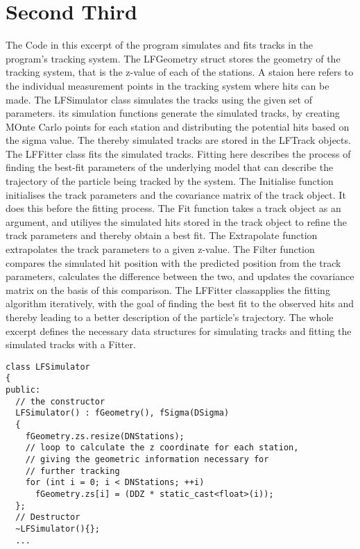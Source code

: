 \documentclass{article}
\begin{document}
\section*{Second Third}
The Code in this excerpt of the program simulates and fits tracks in the program's tracking system.  The LFGeometry struct stores the geometry of the tracking system, that is the z-value of each of the stations. A staion here refers to the individual measurement points in the tracking system where hits can be made. The LFSimulator class simulates the tracks using the given set of parameters. its simulation functions generate the simulated tracks, by creating MOnte Carlo points for each station and distributing the potential hits based on the sigma value. The thereby simulated tracks are stored in the LFTrack objects.  
The LFFitter class fits the simulated tracks. Fitting here describes the process of finding the best-fit parameters of the underlying model that can describe the trajectory of the particle being tracked by the system. The Initialise function initialises the track parameters and the covariance matrix of the track object. It does this before the fitting process. The Fit function takes a track object as an argument, and utiliyes the simulated hits stored in the track object to refine the track parameters and thereby obtain a best fit. The Extrapolate function extrapolates the track parameters to a given z-value. The Filter function compares the simulated hit position with the predicted position from the track parameters, calculates the difference between the two, and updates the covariance matrix on the basis of this comparison. The LFFitter classapplies the fitting algorithm iteratively, with the goal of finding the best fit to the observed hits and thereby leading to a better description of the particle's trajectory.
The whole excerpt defines the necessary data structures for simulating tracks and fitting the simulated tracks with a Fitter.
\\
\begin{lstlisting}[LFSSimulator Excerpt]
 class LFSimulator
{
public:
  // the constructor
  LFSimulator() : fGeometry(), fSigma(DSigma)
  {
    fGeometry.zs.resize(DNStations);
    // loop to calculate the z coordinate for each station,
    // giving the geometric information necessary for
    // further tracking
    for (int i = 0; i < DNStations; ++i)
      fGeometry.zs[i] = (DDZ * static_cast<float>(i));
  };
  // Destructor
  ~LFSimulator(){};
  ...
\end{lstlisting}
\end{document}

